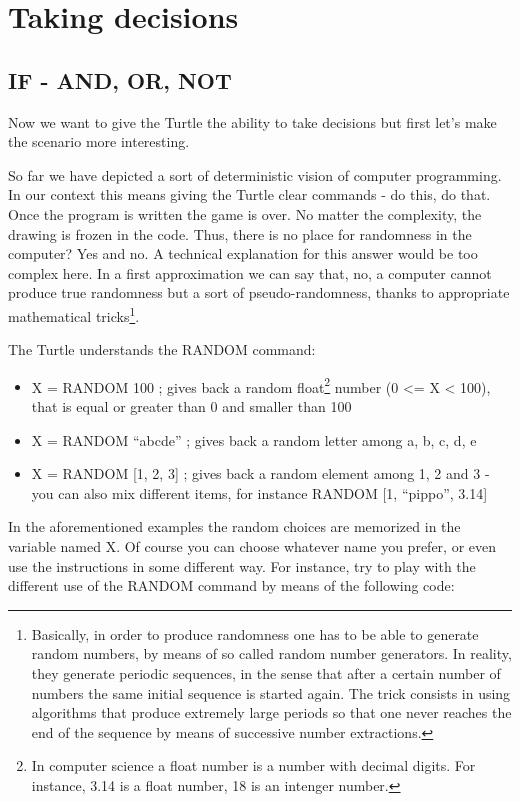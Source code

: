 \chapter{Taking decisions} \label{cap:decidere}

\section{IF - AND, OR, NOT}

Now we want to give the Turtle the ability to take decisions but first let's make the scenario more interesting. 

So far we have depicted a sort of deterministic vision of computer programming. In our context this means giving the Turtle clear commands - do this, do that. Once the program is written the game is over. No matter the complexity, the drawing is frozen in the code. Thus, there is no place for randomness in the computer? Yes and no. A technical explanation for this answer would be too complex here. In a first approximation we can say that, no, a computer cannot produce true randomness but a sort of pseudo-randomness, thanks to appropriate mathematical tricks\footnote{Basically, in order to produce randomness one has to be able to generate random numbers, by means of so called random number generators. In reality, they generate periodic sequences, in the sense that after a certain number of numbers the same initial sequence is started again. The trick consists in using algorithms that produce extremely large periods so that one never reaches the end of the sequence by means of successive number extractions.}.

The Turtle understands the RANDOM command:

\begin{itemize}
\item X = RANDOM 100 ; gives back a random float\footnote{In computer science a float number is a number with decimal digits. For instance, 3.14 is a float number, 18 is an intenger number.} number (0 <= X < 100), that is equal or greater than 0 and smaller than 100
\item X = RANDOM “abcde” ; gives back a random letter among a, b, c, d, e
\item X = RANDOM [1, 2, 3] ; gives back a random element among 1, 2 and 3 - you can also mix different items, for instance RANDOM [1, “pippo”, 3.14]
\end{itemize}

In the aforementioned examples the random choices are memorized in the variable named X. Of course you can choose whatever name you prefer, or even use the instructions in some different way. For instance, try to play with the different use of the RANDOM command by means of the following code:

